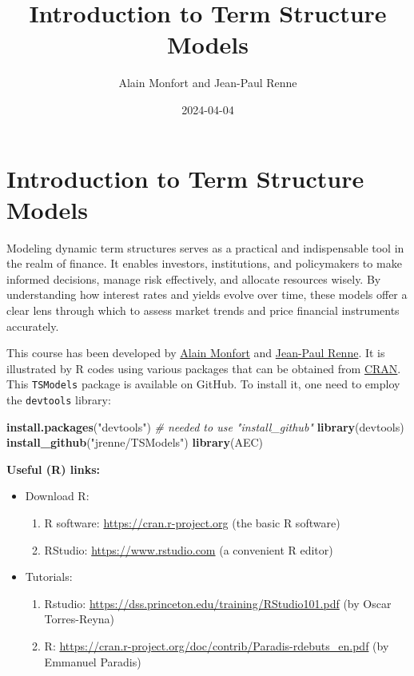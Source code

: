 \documentclass[
  12pt,
]{book}
\title{Introduction to Term Structure Models}
\author{Alain Monfort and Jean-Paul Renne}
\date{2024-04-04}
\newenvironment{Shaded}{\begin{snugshade}}{\end{snugshade}}
\newcommand{\CommentTok}[1]{\textcolor[rgb]{0.56,0.35,0.01}{\textit{#1}}}
\newcommand{\FunctionTok}[1]{\textcolor[rgb]{0.13,0.29,0.53}{\textbf{#1}}}
\newcommand{\NormalTok}[1]{#1}
\newcommand{\StringTok}[1]{\textcolor[rgb]{0.31,0.60,0.02}{#1}}
\providecommand{\tightlist}{%
  \setlength{\itemsep}{0pt}\setlength{\parskip}{0pt}}
\theoremstyle{definition}
\theoremstyle{definition}
\theoremstyle{definition}
\theoremstyle{definition}
\theoremstyle{remark}
\begin{document}
\maketitle

{
\setcounter{tocdepth}{1}
\tableofcontents
}
\newcommand{\bv}[1]{\mathbf{#1}}

\hypertarget{intro}{%
\chapter*{Introduction to Term Structure Models}\label{intro}}

Modeling dynamic term structures serves as a practical and indispensable tool in the realm of finance. It enables investors, institutions, and policymakers to make informed decisions, manage risk effectively, and allocate resources wisely. By understanding how interest rates and yields evolve over time, these models offer a clear lens through which to assess market trends and price financial instruments accurately.

This course has been developed by \href{https://faculty.crest.fr/amonfort/}{Alain Monfort} and \href{https://sites.google.com/site/jeanpaulrenne/home}{Jean-Paul Renne}. It is illustrated by R codes using various packages that can be obtained from \href{https://cran.r-project.org}{CRAN}. This \texttt{TSModels} package is available on GitHub. To install it, one need to employ the \texttt{devtools} library:

\begin{Shaded}
\begin{Highlighting}[]
\FunctionTok{install.packages}\NormalTok{(}\StringTok{"devtools"}\NormalTok{) }\CommentTok{\# needed to use "install\_github"}
\FunctionTok{library}\NormalTok{(devtools)}
\FunctionTok{install\_github}\NormalTok{(}\StringTok{"jrenne/TSModels"}\NormalTok{)}
\FunctionTok{library}\NormalTok{(AEC)}
\end{Highlighting}
\end{Shaded}

\textbf{Useful (R) links:}

\begin{itemize}
\item
  Download R:

  \begin{enumerate}
  \def\labelenumi{\alph{enumi}.}
  \tightlist
  \item
    R software: \url{https://cran.r-project.org} (the basic R software)
  \item
    RStudio: \url{https://www.rstudio.com} (a convenient R editor)
  \end{enumerate}
\item
  Tutorials:

  \begin{enumerate}
  \def\labelenumi{\alph{enumi}.}
  \tightlist
  \item
    Rstudio: \url{https://dss.princeton.edu/training/RStudio101.pdf} (by Oscar Torres-Reyna)
  \item
    R: \url{https://cran.r-project.org/doc/contrib/Paradis-rdebuts_en.pdf} (by Emmanuel Paradis)
  \end{enumerate}
\end{itemize}
\end{document}
